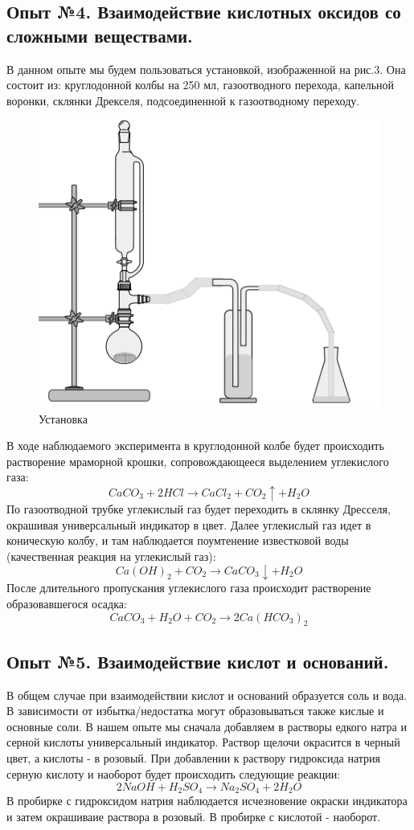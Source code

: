 \documentclass[a4paper, 12pt]{article}
\begin{document}
\subsection{Опыт №4. Взаимодействие кислотных оксидов со сложными веществами.}
В данном опыте мы будем пользоваться установкой, изображенной на рис.3. Она состоит из: круглодонной колбы на 250 мл, газоотводного перехода, капельной воронки, склянки Дрекселя, подсоединенной к газоотводному переходу.
\begin{figure}[h]
    \centering
    \includegraphics[width=0.55\linewidth]{2024-02-10_18-57-58.png}
    \caption{Установка}
    \label{fig:enter-label}
\end{figure}
\newline
В ходе наблюдаемого эксперимента в круглодонной колбе будет происходить растворение мраморной крошки, сопровождающееся выделением углекислого газа:
\begin{equation}
    CaCO_3 + 2HCl \xrightarrow{} CaCl_2 + CO_2\uparrow + H_2 O
\end{equation}
По газоотводной трубке углекислый газ будет переходить в склянку Дресселя, окрашивая универсальный индикатор в цвет. Далее углекислый газ идет в коническую колбу, и там наблюдается поумтенение известковой воды (качественная реакция на углекислый газ):
\begin{equation}
    Ca(OH)_2 + CO_2 \xrightarrow{} CaCO_3\downarrow + H_2 O
\end{equation}
После длительного пропускания углекислого газа происходит растворение образовавшегося осадка:
\begin{equation}
    CaCO_3 + H_2 O + CO_2 \xrightarrow{} 2Ca(HCO_3 )_2
\end{equation}
\subsection{Опыт №5. Взаимодействие кислот и оснований.}
В общем случае при взаимодействии кислот и оснований образуется соль и вода. В зависимости от избытка/недостатка могут образовываться также кислые и основные соли. В нашем опыте мы сначала добавляем в растворы едкого натра и серной кислоты универсальный индикатор. Раствор щелочи окрасится в черный цвет, а кислоты - в розовый. При добавлении к раствору гидроксида натрия серную кислоту и наоборот будет происходить следующие реакции:
\begin{equation}
    2NaOH + H_2 SO_4 \xrightarrow{} Na_2 SO_4 + 2H_2 O
\end{equation}
В пробирке с гидроксидом натрия наблюдается исчезновение окраски индикатора и затем окрашиваие раствора в розовый. В пробирке с кислотой - наоборот. 
\end{document}
